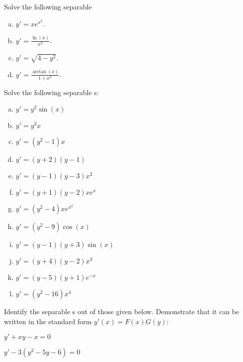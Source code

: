 \begin{question}
  Solve the following separable \ode{}
  \begin{enumerate}[a)]
  \item $\displaystyle y' = x e^{x^2}$.
  \item $\displaystyle y' = \frac{\ln(x)}{x^2}$.
  \item $\displaystyle y' = \sqrt{4-y^2}$.
  \item $\displaystyle y' = \frac{\arctan(x)}{1+x^2}$.
\end{enumerate}
\end{question}

\begin{question}
  Solve the following separable \ode{}s:
  \begin{multicols}{3}
  \begin{enumerate}[a)]
    \item $\displaystyle y' = y^2 \sin(x)$
    \item $\displaystyle y' = y^3 x$
    \item $\displaystyle y' = (y^2-1)x$
    \item $\displaystyle y' = (y+2)(y-1)$
    \item $\displaystyle y' = (y-1)(y-3)x^2$
    \item $\displaystyle y' = (y+1)(y-2)x e^x$
    \item $\displaystyle y' = (y^2-4)xe^{x^2}$
    \item $\displaystyle y' = (y^2-9)\cos(x)$
    \item $\displaystyle y' = (y-1)(y+3)\sin(x)$
    \item $\displaystyle y' = (y+4)(y-2)x^3$
    \item $\displaystyle y' = (y-5)(y+1)e^{-x}$
    \item $\displaystyle y' = (y^2-16)x^4$
  \end{enumerate}
  \end{multicols}
\end{question}

\begin{question}Identify the separable \ode{}s out of those given below. Demonstrate that it can be written in the standard form \(y'(x) = F(x) G(y)\):
  \begin{colenumerate}
  \item $y'+xy-x=0$
  \item $y'-3(y^2-5y-6) = 0$
  \end{colenumerate}
\end{question}

